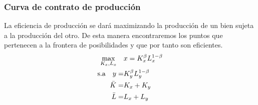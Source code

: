 \subsubsection*{Curva de contrato de producción}

La eficiencia de producción se dará maximizando la producción de un bien sujeta a la producción del otro. De esta manera encontraremos los puntos que pertenecen a la frontera de posibilidades y que por tanto son eficientes. 
\begin{align*}
    \max _{K_x,L_x} \quad &x = K_x^\beta L_x^{1-\beta}\\
    \text{s.a} \quad  y =& K_y^\beta L_y^{1-\beta} \\
     \Bar{K} =& K_x + K_y \\
     \Bar{L} =& L_x + L_y
\end{align*}

